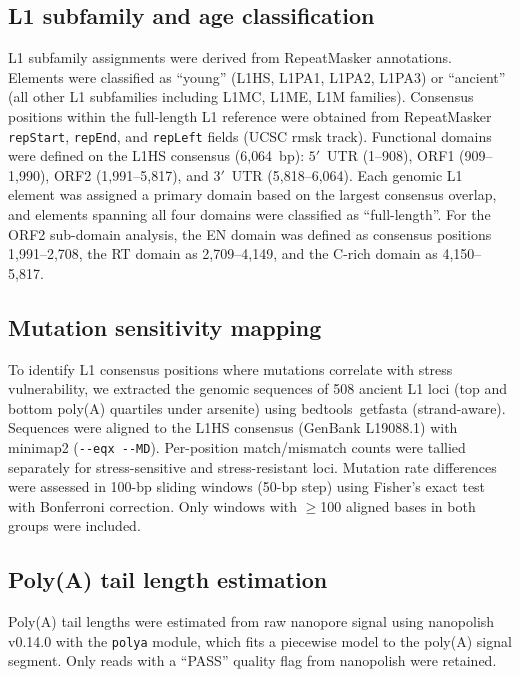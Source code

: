 \documentclass[11pt]{article}
\begin{document}
\subsection*{L1 subfamily and age classification}

L1 subfamily assignments were derived from RepeatMasker annotations.
Elements were classified as ``young'' (L1HS, L1PA1, L1PA2, L1PA3) or
``ancient'' (all other L1 subfamilies including L1MC, L1ME, L1M families).
Consensus positions within the full-length L1 reference were obtained
from RepeatMasker \texttt{repStart}, \texttt{repEnd}, and
\texttt{repLeft} fields (UCSC rmsk track). Functional domains were
defined on the L1HS consensus (6{,}064~bp): $5'$~UTR (1--908),
ORF1 (909--1{,}990), ORF2 (1{,}991--5{,}817), and $3'$~UTR
(5{,}818--6{,}064). Each genomic L1 element was assigned a primary
domain based on the largest consensus overlap, and elements spanning
all four domains were classified as ``full-length''. For the ORF2
sub-domain analysis, the EN domain was defined as consensus positions
1{,}991--2{,}708, the RT domain as 2{,}709--4{,}149, and the C-rich
domain as 4{,}150--5{,}817.

\subsection*{Mutation sensitivity mapping}

To identify L1 consensus positions where mutations correlate with stress
vulnerability, we extracted the genomic sequences of 508 ancient L1 loci
(top and bottom poly(A) quartiles under arsenite) using
bedtools~getfasta (strand-aware). Sequences were aligned to the L1HS
consensus (GenBank L19088.1) with minimap2 (\texttt{-{}-eqx -{}-MD}).
Per-position match/mismatch counts were tallied separately for
stress-sensitive and stress-resistant loci. Mutation rate differences
were assessed in 100-bp sliding windows (50-bp step) using Fisher's
exact test with Bonferroni correction. Only windows with $\geq$100
aligned bases in both groups were included.

\subsection*{Poly(A) tail length estimation}

Poly(A) tail lengths were estimated from raw nanopore signal using
nanopolish v0.14.0 \citep{Simpson2017nanopolish} with the
\texttt{polya} module, which fits a piecewise model to the poly(A)
signal segment. Only reads with a ``PASS'' quality flag from nanopolish
were retained.
\end{document}
